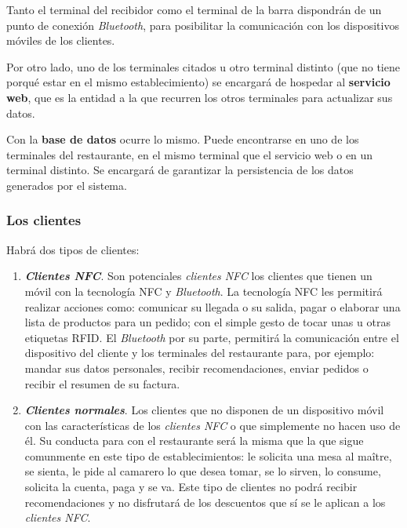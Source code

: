   Tanto el terminal del recibidor como el terminal de la barra dispondrán
  de un punto de conexión \emph{Bluetooth}, para posibilitar la comunicación
  con los dispositivos móviles de los clientes.

  Por otro lado, uno de los terminales citados u otro terminal distinto (que
  no tiene porqué estar en el mismo establecimiento) se encargará de hospedar
  al \textbf{servicio web}, que es la entidad a la que recurren los otros
  terminales para actualizar sus datos.

  Con la \textbf{base de datos} ocurre lo mismo. Puede encontrarse en uno de
  los terminales del restaurante, en el mismo terminal que el servicio web o
  en un terminal distinto. Se encargará de garantizar la persistencia de los
  datos generados por el sistema.



    \subsubsection{Los clientes}
    \label{subsubsec:clients}
  Habrá dos tipos de clientes:
  \begin{enumerate}
  \item \emph{\textbf{Clientes \acs{NFC}}}. Son potenciales \emph{clientes
  \acs{NFC}} los clientes que tienen un móvil con la tecnología \acs{NFC} y
  \emph{Bluetooth}. La tecnología \acs{NFC} les permitirá realizar acciones
  como: comunicar su llegada o su salida, pagar o elaborar una lista de
  productos para un pedido; con el simple gesto de tocar unas u otras
  etiquetas \acs{RFID}. El \emph{Bluetooth} por su parte, permitirá la
  comunicación entre el dispositivo del cliente y los terminales del
  restaurante para, por ejemplo: mandar sus datos personales, recibir
  recomendaciones, enviar pedidos o recibir el resumen de su factura.
  \item \emph{\textbf{Clientes normales}}. Los clientes que no disponen
  de un dispositivo móvil con las características de los \emph{clientes
  \acs{NFC}} o que simplemente no hacen uso de él. Su conducta para con
  el restaurante será la misma que la que sigue comunmente en este tipo
  de establecimientos: le solicita una mesa al maître, se sienta, le
  pide al camarero lo que desea tomar, se lo sirven, lo consume, solicita
  la cuenta, paga y se va. Este tipo de clientes no podrá recibir
  recomendaciones y no disfrutará de los descuentos que sí se le aplican
  a los \emph{clientes \acs{NFC}}.
  \end{enumerate}


